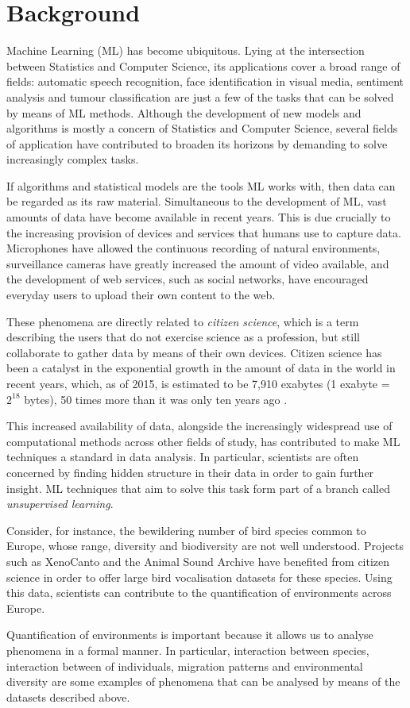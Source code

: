 \documentclass[../main.tex]{subfiles}
\begin{document}
 \label{chapter_intro}
\section{Background}
Machine Learning (ML) has become ubiquitous. Lying at the intersection between Statistics and Computer Science, its applications cover a broad range of fields: automatic speech recognition, face identification in visual media, sentiment analysis and tumour classification are just a few of the tasks that can be solved by means of ML methods. Although the development of new models and algorithms is mostly a concern of Statistics and Computer Science, several fields of application have contributed to broaden its horizons by demanding to solve increasingly complex tasks. 
\par If algorithms and statistical models are the tools ML works with, then data can be regarded as its raw material. Simultaneous to the development of ML, vast amounts of data have become available in recent years. This is due crucially to the increasing provision of devices and services that humans use to capture data. Microphones have allowed the continuous recording of natural environments, surveillance cameras have greatly increased the amount of video available, and the development of web services, such as social networks, have encouraged everyday users to upload their own content to the web. 
\par These phenomena are directly related to \emph{citizen science}, which is a term describing the users that do not exercise science as a profession, but still collaborate to gather data by means of their own devices. Citizen science has been a catalyst in the exponential growth in the amount of data in the world in recent years, which, as of 2015, is estimated to be 7,910 exabytes (1 exabyte = $2^{18}$ bytes), 50 times more than it was only ten years ago \cite{TheEconomistOnline2011}.
\par This increased availability of data, alongside the increasingly widespread use of computational methods across other fields of study, has contributed to make ML techniques a standard in data analysis. In particular, scientists are often concerned by finding hidden structure in their data in order to gain further insight. ML techniques that aim to solve this task form part of a branch called \emph{unsupervised learning}. 
\par Consider, for instance, the bewildering number of bird species common to Europe, whose range, diversity and biodiversity are not well understood. Projects such as XenoCanto and the Animal Sound Archive have benefited from citizen science in order to offer large bird vocalisation datasets for these species. Using this data, scientists can contribute to the quantification of environments across Europe.
\par Quantification of environments is important because it allows us to analyse phenomena in a formal manner. In particular, interaction between species, interaction between of individuals, migration patterns and environmental diversity are some examples of phenomena that can be analysed by means of the datasets described above.
\end{document}
